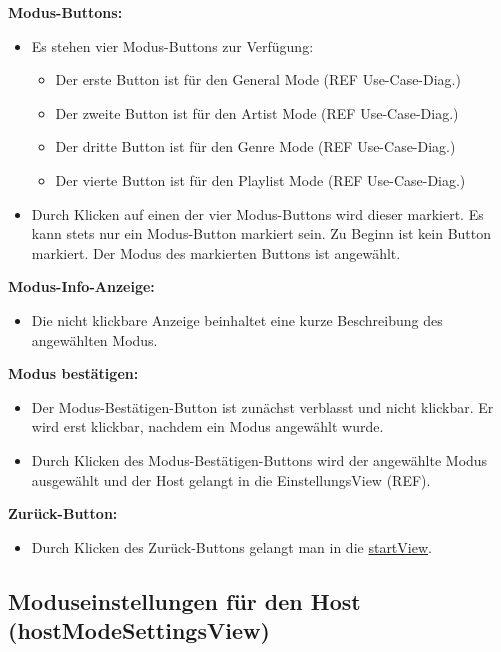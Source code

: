 \documentclass[oneside, ngerman]{sdqtechreport}
\begin{document}
\textbf{Modus-Buttons:}
\begin{itemize}
    \item Es stehen vier Modus-Buttons zur Verfügung:
    \begin{itemize}
        \item Der erste Button ist für den General Mode (REF Use-Case-Diag.)
        \item Der zweite Button ist für den Artist Mode (REF Use-Case-Diag.)
        \item Der dritte Button ist für den Genre Mode (REF Use-Case-Diag.)
        \item Der vierte Button ist für den Playlist Mode (REF Use-Case-Diag.)
    \end{itemize}
    \item Durch Klicken auf einen der vier Modus-Buttons wird dieser markiert. Es kann stets nur ein Modus-Button markiert sein. Zu Beginn ist kein Button markiert. Der Modus des markierten Buttons ist angewählt.
\end{itemize}

\textbf{Modus-Info-Anzeige:}
\begin{itemize}
    \item Die nicht klickbare Anzeige beinhaltet eine kurze Beschreibung des angewählten Modus.
\end{itemize}

\textbf{Modus bestätigen:}
\begin{itemize}
    \item Der Modus-Bestätigen-Button ist zunächst verblasst und nicht klickbar. Er wird erst klickbar, nachdem ein Modus angewählt wurde.
    \item Durch Klicken des Modus-Bestätigen-Buttons wird der angewählte Modus ausgewählt und der Host gelangt in die EinstellungsView (REF).
\end{itemize}

\textbf{Zurück-Button:}
\begin{itemize}
    \item Durch Klicken des Zurück-Buttons gelangt man in die  \hyperlink{startView}{startView}.
\end{itemize}


\subsection{Moduseinstellungen für den Host (hostModeSettingsView)}
\label{sec:Benutzeroberfläche:joinSessionView}
\end{document}
